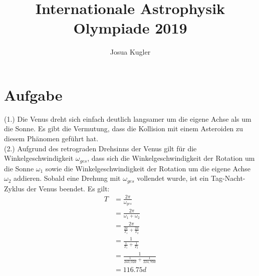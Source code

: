 \documentclass{article}
\title{Internationale Astrophysik Olympiade 2019}
\author{Josua Kugler}
\begin{document}
	\maketitle
	\section{Aufgabe}
	(1.) Die Venus dreht sich einfach deutlich langsamer um die eigene Achse als um die Sonne. Es gibt die Vermutung, dass die Kollision mit einem Asteroiden zu diesem Phänomen geführt hat.\\
	(2.) Aufgrund des retrograden Drehsinns der Venus gilt für die Winkelgeschwindigkeit $\omega_{ges}$, dass sich die Winkelgeschwindigkeit der Rotation um die Sonne $\omega_{1}$ sowie die Winkelgeschwindigkeit der Rotation um die eigene Achse $\omega_{2}$ addieren. Sobald eine Drehung mit $\omega_{ges}$ vollendet wurde, ist ein Tag-Nacht-Zyklus der Venus beendet.
	Es gilt:
	\begin{align*}
		T&=\frac{2\pi}{\omega_{ges}}\\
		&=\frac{2\pi}{\omega_{1}+\omega_{2}}\\
		&=\frac{2\pi}{\frac{2\pi}{T_1}+\frac{2\pi}{T_2}}\\
		&=\frac{1}{\frac{1}{T_1}+\frac{1}{T_2}}\\
		&=\frac{1}{\frac{1}{243,02d}+\frac{1}{224,70d}}\\
		&=116.75d
	\end{align*}
\end{document}
